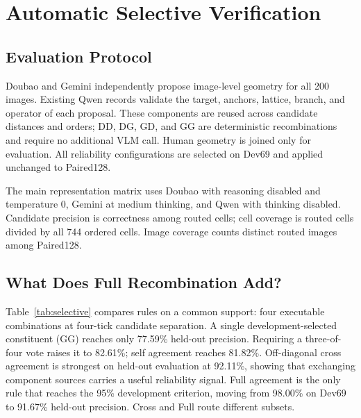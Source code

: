 \section{Automatic Selective Verification}
\label{sec:automatic}

\begin{table}[t]
  \centering
  \caption{\textbf{Same-support attribution.} All rows use four executable target--lattice combinations and four-tick candidate separation. Dev support contains 78 ordered cells; held-out support contains 116. Cell coverage is measured over all 744 held-out cells.}
  \label{tab:selective}
  \small
  \setlength{\tabcolsep}{4pt}
  
\end{table}

\subsection{Evaluation Protocol}

Doubao and Gemini independently propose image-level geometry for all 200 images. Existing Qwen records validate the target, anchors, lattice, branch, and operator of each proposal. These components are reused across candidate distances and orders; DD, DG, GD, and GG are deterministic recombinations and require no additional VLM call. Human geometry is joined only for evaluation. All reliability configurations are selected on Dev69 and applied unchanged to Paired128.

The main representation matrix uses Doubao with reasoning disabled and temperature 0, Gemini at medium thinking, and Qwen with thinking disabled. Candidate precision is correctness among routed cells; cell coverage is routed cells divided by all 744 ordered cells. Image coverage counts distinct routed images among Paired128.

\subsection{What Does Full Recombination Add?}

Table~\ref{tab:selective} compares rules on a common support: four executable combinations at four-tick candidate separation. A single development-selected constituent (GG) reaches only 77.59\% held-out precision. Requiring a three-of-four vote raises it to 82.61\%; self agreement reaches 81.82\%. Off-diagonal cross agreement is strongest on held-out evaluation at 92.11\%, showing that exchanging component sources carries a useful reliability signal. Full agreement is the only rule that reaches the 95\% development criterion, moving from 98.00\% on Dev69 to 91.67\% held-out precision. Cross and Full route different subsets.

